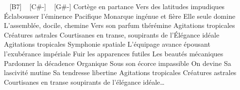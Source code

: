 \begin{guitar}
[F#-7] ~ [B7] ~ [C#-] ~ [G#-]
Cortège en partance
Vers des latitudes impudiques
Éclabousser l'éminence
Pacifique
Monarque ingénue et fière
Elle seule domine
L'assemblée, docile, chemine
Vers son parfum thérémine
Agitations tropicales
Créatures astrales
Courtisanes en transe, soupirants de l'Élégance idéale
Agitations tropicales
Symphonie spatiale
L'équipage avance épousant l'exubérance impériale
Fuir les apparences futiles
Les beautés mécaniques
Pardonner la décadence
Organique
Sous son écorce impassible
On devine
Sa lascivité mutine
Sa tendresse libertine
Agitations tropicales
Créatures astrales
Courtisanes en transe soupirants de l'élégance idéale… 
\end{guitar}